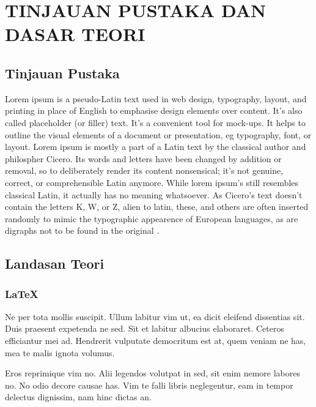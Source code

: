 
\chapter{TINJAUAN PUSTAKA DAN DASAR TEORI}                

\section{Tinjauan Pustaka}
  Lorem ipsum is a pseudo-Latin text used in web design, typography, layout, and printing in place of English to emphasise design elements over content. It's also called placeholder (or filler) text. It's a convenient tool for mock-ups. It helps to outline the visual elements of a document or presentation, eg typography, font, or layout. Lorem ipsum is mostly a part of a Latin text by the classical author and philospher Cicero. Its words and letters have been changed by addition or removal, so to deliberately render its content nonsensical; it's not genuine, correct, or comprehensible Latin anymore. While lorem ipsum's still resembles classical Latin, it actually has no meaning whatsoever. As Cicero's text doesn't contain the letters K, W, or Z, alien to latin, these, and others are often inserted randomly to mimic the typographic appearence of European languages, as are digraphs not to be found in the original \cite{DaSilvaCampos2011}.

\section{Landasan Teori}
  \subsection{\LaTeX}
    Ne per tota mollis suscipit. Ullum labitur vim ut, ea dicit eleifend dissentias sit. Duis praesent expetenda ne sed. Sit et labitur albucius elaboraret. Ceteros efficiantur mei ad. Hendrerit vulputate democritum est at, quem veniam ne has, mea te malis ignota volumus.

    Eros reprimique vim no. Alii legendos volutpat in sed, sit enim nemore labores no. No odio decore causae has. Vim te falli libris neglegentur, eam in tempor delectus dignissim, nam hinc dictas an.

